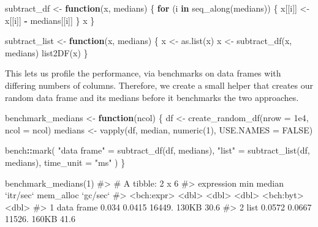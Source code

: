 \documentclass[
]{krantz}
\makeatletter
\newenvironment{Shaded}{\begin{snugshade}}{\end{snugshade}}
\newcommand{\CommentTok}[1]{\textcolor[rgb]{0.56,0.35,0.01}{\textit{#1}}}
\newcommand{\ControlFlowTok}[1]{\textcolor[rgb]{0.13,0.29,0.53}{\textbf{#1}}}
\newcommand{\DataTypeTok}[1]{\textcolor[rgb]{0.13,0.29,0.53}{#1}}
\newcommand{\DecValTok}[1]{\textcolor[rgb]{0.00,0.00,0.81}{#1}}
\newcommand{\FloatTok}[1]{\textcolor[rgb]{0.00,0.00,0.81}{#1}}
\newcommand{\KeywordTok}[1]{\textcolor[rgb]{0.13,0.29,0.53}{\textbf{#1}}}
\newcommand{\NormalTok}[1]{#1}
\newcommand{\OperatorTok}[1]{\textcolor[rgb]{0.81,0.36,0.00}{\textbf{#1}}}
\newcommand{\OtherTok}[1]{\textcolor[rgb]{0.56,0.35,0.01}{#1}}
\newcommand{\StringTok}[1]{\textcolor[rgb]{0.31,0.60,0.02}{#1}}
\newenvironment{kframe}{%
\medskip{}
\setlength{\fboxsep}{.8em}
 \def\at@end@of@kframe{}%
 \ifinner\ifhmode%
  \def\at@end@of@kframe{\end{minipage}}%
  \begin{minipage}{\columnwidth}%
 \fi\fi%
 \def\FrameCommand##1{\hskip\@totalleftmargin \hskip-\fboxsep
 \colorbox{shadecolor}{##1}\hskip-\fboxsep
     \hskip-\linewidth \hskip-\@totalleftmargin \hskip\columnwidth}%
 \MakeFramed {\advance\hsize-\width
   \@totalleftmargin\z@ \linewidth\hsize
   \@setminipage}}%
 {\par\unskip\endMakeFramed%
 \at@end@of@kframe}
\renewenvironment{Shaded}{\begin{kframe}}{\end{kframe}}
\renewcommand{\KeywordTok} [1]{\textcolor[rgb]{0.00,0.44,0.13}{{#1}}}
\renewcommand{\DataTypeTok}[1]{\textcolor[rgb]{0.56,0.13,0.00}{{#1}}}
\renewcommand{\DecValTok}  [1]{\textcolor[rgb]{0.25,0.63,0.44}{{#1}}}
\renewcommand{\FloatTok}   [1]{\textcolor[rgb]{0.25,0.63,0.44}{{#1}}}
\renewcommand{\StringTok}  [1]{\textcolor[rgb]{0.25,0.44,0.63}{{#1}}}
\renewcommand{\CommentTok} [1]{\textcolor[rgb]{0.38,0.63,0.69}{{#1}}}
\renewcommand{\OtherTok}   [1]{\textcolor[rgb]{0.00,0.44,0.13}{{#1}}}
\renewcommand{\NormalTok}  [1]{{#1}}
\makeatother
\begin{document}
\begin{Shaded}
\begin{Highlighting}[]
\NormalTok{subtract_df <-}\StringTok{ }\ControlFlowTok{function}\NormalTok{(x, medians) \{}
  \ControlFlowTok{for}\NormalTok{ (i }\ControlFlowTok{in} \KeywordTok{seq_along}\NormalTok{(medians)) \{}
\NormalTok{    x[[i]] <-}\StringTok{ }\NormalTok{x[[i]] }\OperatorTok{-}\StringTok{ }\NormalTok{medians[[i]]}
\NormalTok{  \}}
\NormalTok{  x}
\NormalTok{\}}

\NormalTok{subtract_list <-}\StringTok{ }\ControlFlowTok{function}\NormalTok{(x, medians) \{}
\NormalTok{  x <-}\StringTok{ }\KeywordTok{as.list}\NormalTok{(x)}
\NormalTok{  x <-}\StringTok{ }\KeywordTok{subtract_df}\NormalTok{(x, medians)}
  \KeywordTok{list2DF}\NormalTok{(x)}
\NormalTok{\}}
\end{Highlighting}
\end{Shaded}

This lets us profile the performance, via benchmarks on data frames with differing numbers of columns. Therefore, we create a small helper that creates our random data frame and its medians before it benchmarks the two approaches.

\begin{Shaded}
\begin{Highlighting}[]
\NormalTok{benchmark_medians <-}\StringTok{ }\ControlFlowTok{function}\NormalTok{(ncol) \{}
\NormalTok{  df <-}\StringTok{ }\KeywordTok{create_random_df}\NormalTok{(}\DataTypeTok{nrow =} \FloatTok{1e4}\NormalTok{, }\DataTypeTok{ncol =}\NormalTok{ ncol)}
\NormalTok{  medians <-}\StringTok{ }\KeywordTok{vapply}\NormalTok{(df, median, }\KeywordTok{numeric}\NormalTok{(}\DecValTok{1}\NormalTok{), }\DataTypeTok{USE.NAMES =} \OtherTok{FALSE}\NormalTok{)}

\NormalTok{  bench}\OperatorTok{::}\KeywordTok{mark}\NormalTok{(}
    \StringTok{"data frame"}\NormalTok{ =}\StringTok{ }\KeywordTok{subtract_df}\NormalTok{(df, medians),}
    \StringTok{"list"}\NormalTok{ =}\StringTok{ }\KeywordTok{subtract_list}\NormalTok{(df, medians),}
    \DataTypeTok{time_unit =} \StringTok{"ms"}
\NormalTok{  )}
\NormalTok{\}}

\KeywordTok{benchmark_medians}\NormalTok{(}\DecValTok{1}\NormalTok{)}
\CommentTok{#> # A tibble: 2 x 6}
\CommentTok{#>   expression    min median `itr/sec` mem_alloc `gc/sec`}
\CommentTok{#>   <bch:expr>  <dbl>  <dbl>     <dbl> <bch:byt>    <dbl>}
\CommentTok{#> 1 data frame 0.034  0.0415    16449.     130KB     30.6}
\CommentTok{#> 2 list       0.0572 0.0667    11526.     160KB     41.6}
\end{Highlighting}
\end{Shaded}
\end{document}
